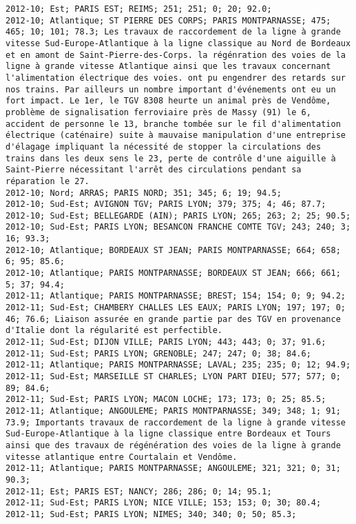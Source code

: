 \documentclass{article}
\begin{document}
\begin{Verbatim}[commandchars=\\\{\}]
2012-10; Est; PARIS EST; REIMS; 251; 251; 0; 20; 92.0; 
2012-10; Atlantique; ST PIERRE DES CORPS; PARIS MONTPARNASSE; 475; 465; 10; 101; 78.3; Les travaux de raccordement de la ligne à grande vitesse Sud-Europe-Atlantique à la ligne classique au Nord de Bordeaux et en amont de Saint-Pierre-des-Corps. la régénration des voies de la ligne à grande vitesse Atlantique ainsi que les travaux concernant l'alimentation électrique des voies. ont pu engendrer des retards sur nos trains. Par ailleurs un nombre important d'événements ont eu un fort impact. Le 1er, le TGV 8308 heurte un animal près de Vendôme, problème de signalisation ferroviaire près de Massy (91) le 6, accident de personne le 13, branche tombée sur le fil d'alimentation électrique (caténaire) suite à mauvaise manipulation d'une entreprise d'élagage impliquant la nécessité de stopper la circulations des trains dans les deux sens le 23, perte de contrôle d'une aiguille à Saint-Pierre nécessitant l'arrêt des circulations pendant sa réparation le 27.
2012-10; Nord; ARRAS; PARIS NORD; 351; 345; 6; 19; 94.5; 
2012-10; Sud-Est; AVIGNON TGV; PARIS LYON; 379; 375; 4; 46; 87.7; 
2012-10; Sud-Est; BELLEGARDE (AIN); PARIS LYON; 265; 263; 2; 25; 90.5; 
2012-10; Sud-Est; PARIS LYON; BESANCON FRANCHE COMTE TGV; 243; 240; 3; 16; 93.3; 
2012-10; Atlantique; BORDEAUX ST JEAN; PARIS MONTPARNASSE; 664; 658; 6; 95; 85.6; 
2012-10; Atlantique; PARIS MONTPARNASSE; BORDEAUX ST JEAN; 666; 661; 5; 37; 94.4; 
2012-11; Atlantique; PARIS MONTPARNASSE; BREST; 154; 154; 0; 9; 94.2; 
2012-11; Sud-Est; CHAMBERY CHALLES LES EAUX; PARIS LYON; 197; 197; 0; 46; 76.6; Liaison assurée en grande partie par des TGV en provenance d'Italie dont la régularité est perfectible.
2012-11; Sud-Est; DIJON VILLE; PARIS LYON; 443; 443; 0; 37; 91.6; 
2012-11; Sud-Est; PARIS LYON; GRENOBLE; 247; 247; 0; 38; 84.6; 
2012-11; Atlantique; PARIS MONTPARNASSE; LAVAL; 235; 235; 0; 12; 94.9; 
2012-11; Sud-Est; MARSEILLE ST CHARLES; LYON PART DIEU; 577; 577; 0; 89; 84.6; 
2012-11; Sud-Est; PARIS LYON; MACON LOCHE; 173; 173; 0; 25; 85.5; 
2012-11; Atlantique; ANGOULEME; PARIS MONTPARNASSE; 349; 348; 1; 91; 73.9; Importants travaux de raccordement de la ligne à grande vitesse Sud-Europe-Atlantique à la ligne classique entre Bordeaux et Tours ainsi que des travaux de régénération des voies de la ligne à grande vitesse atlantique entre Courtalain et Vendôme.
2012-11; Atlantique; PARIS MONTPARNASSE; ANGOULEME; 321; 321; 0; 31; 90.3; 
2012-11; Est; PARIS EST; NANCY; 286; 286; 0; 14; 95.1; 
2012-11; Sud-Est; PARIS LYON; NICE VILLE; 153; 153; 0; 30; 80.4; 
2012-11; Sud-Est; PARIS LYON; NIMES; 340; 340; 0; 50; 85.3; 

\end{Verbatim}
\end{document}
